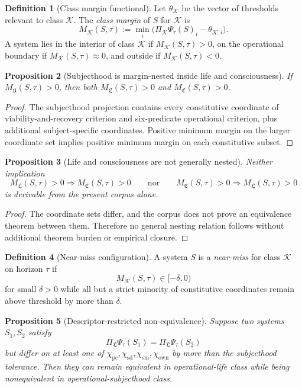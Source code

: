 \documentclass[11pt,a4paper]{article}
\newtheorem{proposition}{Proposition}[section]
\theoremstyle{definition}
\newtheorem{definition}[proposition]{Definition}
\newcommand{\PsiVec}{\Psi}
\newcommand{\Priv}{\chi_{\mathrm{pc}}}
\newcommand{\SelfDisc}{\chi_{\mathrm{sd}}}
\newcommand{\SelfModel}{\chi_{\mathrm{sm}}}
\newcommand{\Own}{\chi_{\mathrm{own}}}
\newcommand{\LifeClass}{\mathfrak{L}}
\newcommand{\ConClass}{\mathfrak{C}}
\newcommand{\SubClass}{\mathfrak{U}}
\begin{document}
\begin{definition}[Class margin functional]
Let $\theta_{\mathcal{K}}$ be the vector of thresholds relevant to class $\mathcal{K}$. The \emph{class margin} of $S$ for $\mathcal{K}$ is
\[
M_{\mathcal{K}}(S,\tau)
:=
\min_i \bigl(\Pi_{\mathcal{K}}\PsiVec_\tau(S)_i-\theta_{\mathcal{K},i}\bigr).
\]
A system lies in the interior of class $\mathcal{K}$ if $M_{\mathcal{K}}(S,\tau)>0$, on the operational boundary if $M_{\mathcal{K}}(S,\tau)\approx 0$, and outside if $M_{\mathcal{K}}(S,\tau)<0$.
\end{definition}

\begin{proposition}[Subjecthood is margin-nested inside life and consciousness]
If $M_{\SubClass}(S,\tau)>0$, then both $M_{\LifeClass}(S,\tau)>0$ and $M_{\ConClass}(S,\tau)>0$.
\end{proposition}

\begin{proof}
The subjecthood projection contains every constitutive coordinate of viability-and-recovery criterion and six-predicate operational criterion, plus additional subject-specific coordinates. Positive minimum margin on the larger coordinate set implies positive minimum margin on each constitutive subset.
\end{proof}

\begin{proposition}[Life and consciousness are not generally nested]
Neither implication
\[
M_{\LifeClass}(S,\tau)>0 \Rightarrow M_{\ConClass}(S,\tau)>0
\qquad\text{nor}\qquad
M_{\ConClass}(S,\tau)>0 \Rightarrow M_{\LifeClass}(S,\tau)>0
\]
is derivable from the present corpus alone.
\end{proposition}

\begin{proof}
The coordinate sets differ, and the corpus does not prove an equivalence theorem between them. Therefore no general nesting relation follows without additional theorem burden or empirical closure.
\end{proof}

\begin{definition}[Near-miss configuration]
A system $S$ is a \emph{near-miss} for class $\mathcal{K}$ on horizon $\tau$ if
\[
M_{\mathcal{K}}(S,\tau)\in[-\delta,0)
\]
for small $\delta>0$ while all but a strict minority of constitutive coordinates remain above threshold by more than $\delta$.
\end{definition}

\begin{proposition}[Descriptor-restricted non-equivalence]
Suppose two systems $S_1,S_2$ satisfy
\[
\Pi_{\LifeClass}\PsiVec_\tau(S_1)=\Pi_{\LifeClass}\PsiVec_\tau(S_2)
\]
but differ on at least one of $\Priv,\SelfDisc,\SelfModel,\Own$ by more than the subjecthood tolerance. Then they can remain equivalent in operational-life class while being nonequivalent in operational-subjecthood class.
\end{proposition}
\end{document}
